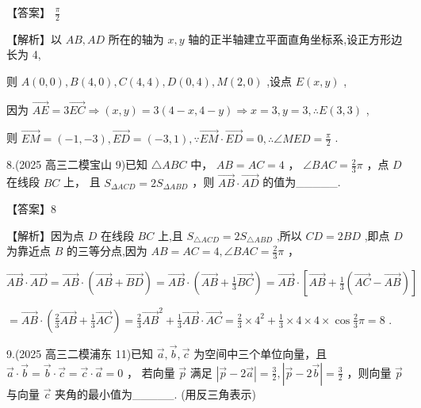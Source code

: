 \documentclass[10pt]{article}
\begin{document}
【答案】 \(\frac{\pi }{2}\)

【解析】以 \({AB},{AD}\) 所在的轴为 \(x,y\) 轴的正半轴建立平面直角坐标系,设正方形边长为 4,

则 \(A\left( {0,0}\right) ,B\left( {4,0}\right) ,C\left( {4,4}\right) ,D\left( {0,4}\right) ,M\left( {2,0}\right)\) ,设点 \(E\left( {x,y}\right)\) ,

因为 \(\overrightarrow{AE} = 3\overrightarrow{EC} \Rightarrow  \left( {x,y}\right)  = 3\left( {4 - x,4 - y}\right)  \Rightarrow  x = 3,y = 3,\therefore E\left( {3,3}\right)\) ,

则 \(\overrightarrow{EM} = \left( {-1, - 3}\right) ,\overrightarrow{ED} = \left( {-3,1}\right) ,\because \overrightarrow{EM} \cdot  \overrightarrow{ED} = 0,\therefore \angle {MED} = \frac{\pi }{2}\) .

8.(2025 高三二模宝山 9)已知 \(\bigtriangleup  {ABC}\) 中， \({AB} = {AC} = 4\) ， \(\angle {BAC} = \frac{2}{3}\pi\) ，点 \(D\) 在线段 \({BC}\) 上， 且 \({S}_{\Delta ACD} = 2{S}_{\Delta ABD}\) ，则 \(\overrightarrow{AB} \cdot  \overrightarrow{AD}\) 的值为\_\_\_\_\_.

【答案】8

【解析】因为点 \(D\) 在线段 \({BC}\) 上,且 \({S}_{\bigtriangleup {ACD}} = 2{S}_{\bigtriangleup {ABD}}\) ,所以 \({CD} = {2BD}\) ,即点 \(D\) 为靠近点 \(B\) 的三等分点,因为 \({AB} = {AC} = 4,\angle {BAC} = \frac{2}{3}\pi\) ，

\(\overrightarrow{AB} \cdot  \overrightarrow{AD} = \overrightarrow{AB} \cdot  \left( {\overrightarrow{AB} + \overrightarrow{BD}}\right)  = \overrightarrow{AB} \cdot  \left( {\overrightarrow{AB} + \frac{1}{3}\overrightarrow{BC}}\right)  = \overrightarrow{AB} \cdot  \left\lbrack  {\overrightarrow{AB} + \frac{1}{3}\left( {\overrightarrow{AC} - \overrightarrow{AB}}\right) }\right\rbrack\)

\(= \overrightarrow{AB} \cdot  \left( {\frac{2}{3}\overrightarrow{AB} + \frac{1}{3}\overrightarrow{AC}}\right)  = \frac{2}{3}{\overrightarrow{AB}}^{2} + \frac{1}{3}\overrightarrow{AB} \cdot  \overrightarrow{AC} = \frac{2}{3} \times  {4}^{2} + \frac{1}{3} \times  4 \times  4 \times  \cos \frac{2}{3}\pi  = 8\) .

9.(2025 高三二模浦东 11)已知 \(\overrightarrow{a},\overrightarrow{b},\overrightarrow{c}\) 为空间中三个单位向量，且 \(\overrightarrow{a} \cdot  \overrightarrow{b} = \overrightarrow{b} \cdot  \overrightarrow{c} = \overrightarrow{c} \cdot  \overrightarrow{a} = 0\) ， 若向量 \(\overrightarrow{p}\) 满足 \(\left| {\overrightarrow{p} - 2\overrightarrow{a}}\right|  = \frac{3}{2},\left| {\overrightarrow{p} - 2\overrightarrow{b}}\right|  = \frac{3}{2}\) ，则向量 \(\overrightarrow{p}\) 与向量 \(\overrightarrow{c}\) 夹角的最小值为\_\_\_\_\_. (用反三角表示)
\end{document}
